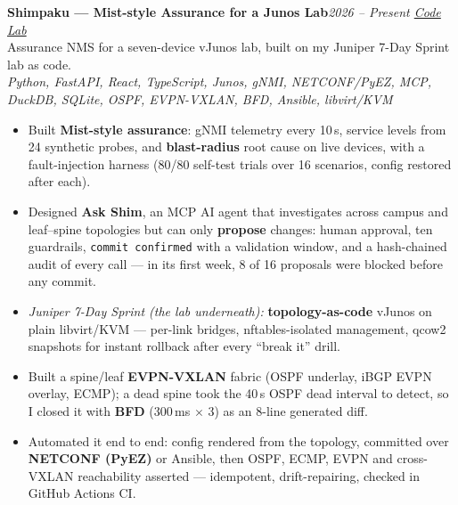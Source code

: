 \documentclass[10pt,a4paper]{article}
\newcommand{\entry}[3]{%
  \textbf{#1}\hfill\textit{\small #2}\\[-0.15em]
  {\small #3}\par\vspace{0.08em}%
}
\begin{document}
\entry{Shimpaku --- Mist-style Assurance for a Junos Lab}{2026 -- Present \textbar{} \href{https://github.com/rohanbatrain/shimpaku}{Code} \textbar{} \href{https://github.com/rohanbatrain/juniper-7-day-sprint}{Lab}}{Assurance NMS for a seven-device vJunos lab, built on my Juniper 7-Day Sprint lab as code.\\ \textit{Python, FastAPI, React, TypeScript, Junos, gNMI, NETCONF/PyEZ, MCP, DuckDB, SQLite, OSPF, EVPN-VXLAN, BFD, Ansible, libvirt/KVM}}
\begin{itemize}
  \item Built \textbf{Mist-style assurance}: gNMI telemetry every 10\,s, service levels from 24 synthetic probes, and \textbf{blast-radius} root cause on live devices, with a fault-injection harness (80/80 self-test trials over 16 scenarios, config restored after each).
  \item Designed \textbf{Ask Shim}, an MCP AI agent that investigates across campus and leaf--spine topologies but can only \textbf{propose} changes: human approval, ten guardrails, \texttt{commit confirmed} with a validation window, and a hash-chained audit of every call --- in its first week, 8 of 16 proposals were blocked before any commit.
  \item \textit{Juniper 7-Day Sprint (the lab underneath):} \textbf{topology-as-code} vJunos on plain libvirt/KVM --- per-link bridges, nftables-isolated management, qcow2 snapshots for instant rollback after every ``break it'' drill.
  \item Built a spine/leaf \textbf{EVPN-VXLAN} fabric (OSPF underlay, iBGP EVPN overlay, ECMP); a dead spine took the 40\,s OSPF dead interval to detect, so I closed it with \textbf{BFD} (300\,ms $\times$ 3) as an 8-line generated diff.
  \item Automated it end to end: config rendered from the topology, committed over \textbf{NETCONF (PyEZ)} or Ansible, then OSPF, ECMP, EVPN and cross-VXLAN reachability asserted --- idempotent, drift-repairing, checked in GitHub Actions CI.
\end{itemize}
\end{document}
